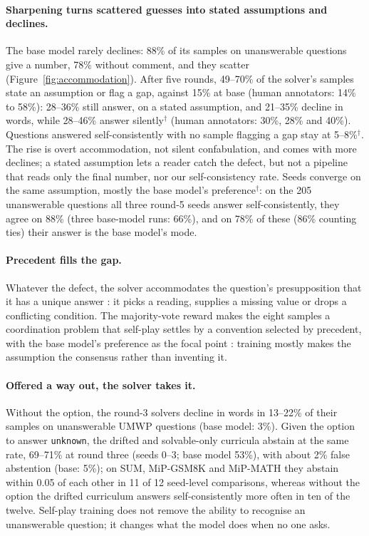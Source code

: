 \paragraph{Sharpening turns scattered guesses into stated assumptions and declines.} The base model rarely declines: 88\% of its samples on unanswerable questions give a number, 78\% without comment, and they scatter (Figure~\ref{fig:accommodation}). After five rounds, 49--70\% of the solver's samples state an assumption or flag a gap, against 15\% at base (human annotators: 14\% to 58\%): 28--36\% still answer, on a stated assumption, and 21--35\% decline in words, while 28--46\% answer silently$^{\dagger}$ (human annotators: 30\%, 28\% and 40\%). Questions answered self-consistently with no sample flagging a gap stay at 5--8\%$^{\dagger}$. The rise is overt accommodation, not silent confabulation, and comes with more declines; a stated assumption lets a reader catch the defect, but not a pipeline that reads only the final number, nor our self-consistency rate. Seeds converge on the same assumption, mostly the base model's preference$^{\dagger}$: on the 205 unanswerable questions all three round-5 seeds answer self-consistently, they agree on 88\% (three base-model runs: 66\%), and on 78\% of these (86\% counting ties) their answer is the base model's mode.

\paragraph{Precedent fills the gap.} Whatever the defect, the solver accommodates \citep{lewis1979scorekeeping} the question's presupposition that it has a unique answer \citep{karttunen1977questions,belnap1976questions}: it picks a reading, supplies a missing value or drops a conflicting condition. The majority-vote reward makes the eight samples a coordination problem that self-play settles by a convention \citep{lewis1969convention} selected by precedent, with the base model's preference as the focal point \citep{schelling1960strategy}: training mostly makes the assumption the consensus rather than inventing it.

\paragraph{Offered a way out, the solver takes it.} Without the option, the round-3 solvers decline in words in 13--22\% of their samples on unanswerable UMWP questions (base model: 3\%). Given the option to answer \texttt{unknown}, the drifted and solvable-only curricula abstain at the same rate, 69--71\% at round three (seeds 0--3; base model 53\%), with about 2\% false abstention (base: 5\%); on SUM, MiP-GSM8K and MiP-MATH \citep{song2025hallucination,fan2025mip} they abstain within 0.05 of each other in 11 of 12 seed-level comparisons, whereas without the option the drifted curriculum answers self-consistently more often in ten of the twelve. Self-play training does not remove the ability to recognise an unanswerable question; it changes what the model does when no one asks.
